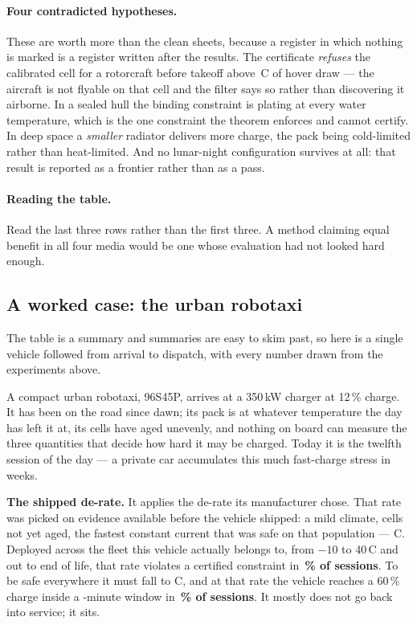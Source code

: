 \documentclass[11pt,letterpaper]{article}
\theoremstyle{definition}
\theoremstyle{remark}
\newcommand{\SI}[2]{#1\,#2}
\newcommand{\degreeCelsius}{\degC}
\newcommand{\degC}{\ifmmode{^\circ}\mathrm{C}\else\textdegree C\fi}
\begin{document}
\paragraph{Four contradicted hypotheses.} These are worth more than the
clean sheets, because a register in which nothing is marked is a register written after the
results. The certificate \emph{refuses} the calibrated cell for a rotorcraft before takeoff above
\aRefuseC\,C of hover draw --- the aircraft is not flyable on that cell and the filter says so
rather than discovering it airborne. In a sealed hull the binding constraint is plating at every
water temperature, which is the one constraint the theorem enforces and cannot certify. In deep
space a \emph{smaller} radiator delivers more charge, the pack being cold-limited rather than
heat-limited. And no lunar-night configuration survives at all: that result is reported as a
frontier rather than as a pass.

\paragraph{Reading the table.} Read the last three rows rather than the first three. A method
claiming equal benefit in all four media would be one whose evaluation had not looked hard
enough.


\subsection{A worked case: the urban robotaxi}\label{sec:casestudy}

The table is a summary and summaries are easy to skim past, so here is a single vehicle followed
from arrival to dispatch, with every number drawn from the experiments above.

A compact urban robotaxi, 96S45P, arrives at a 350\,kW charger at 12\,\% charge. It has been on
the road since dawn; its pack is at whatever temperature the day has left it at, its cells have
aged unevenly, and nothing on board can measure the three quantities that decide how hard it may
be charged. Today it is the twelfth session of the day --- a private car accumulates this much
fast-charge stress in \gWeeks{} weeks.

\textbf{The shipped de-rate.} It applies the de-rate its manufacturer chose. That rate was picked
on evidence available before the vehicle shipped: a mild climate, cells not yet aged, the fastest
constant current that was safe on that population --- \bThreeTuned C. Deployed across the fleet
this vehicle actually belongs to, from $-10$ to \SI{40}{\degreeCelsius} and out to end of life, that rate
violates a certified constraint in \textbf{\bThreeTunedViolPct\,\% of sessions}. To be safe
everywhere it must fall to \bThreeRequired C, and at that rate the vehicle reaches a 60\,\%
charge inside a \gtWindow-minute window in \textbf{\gtReachSixtyCc\,\% of sessions}. It mostly
does not go back into service; it sits.
\end{document}
